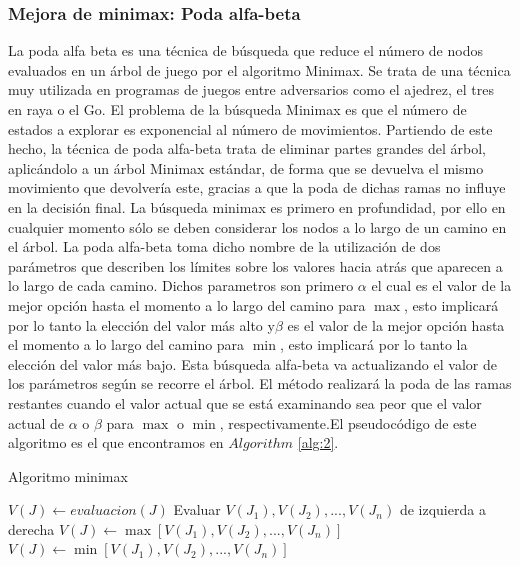 \documentclass[runningheads]{llncs}
\begin{document}
\subsubsection{Mejora de minimax: Poda alfa-beta}
La poda alfa beta es una técnica de búsqueda que reduce el número de nodos evaluados en un árbol de juego por el algoritmo Minimax. Se trata de una técnica muy utilizada en programas de juegos entre adversarios como el ajedrez, el tres en raya o el Go.
El problema de la búsqueda Minimax es que el número de estados a explorar es exponencial al número de movimientos. Partiendo de este hecho, la técnica de poda alfa-beta trata de eliminar partes grandes del árbol, aplicándolo a un árbol Minimax estándar, de forma que se devuelva el mismo movimiento que devolvería este, gracias a que la poda de dichas ramas no influye en la decisión final.
La búsqueda minimax es primero en profundidad, por ello en cualquier momento sólo se deben considerar los nodos a lo largo de un camino en el árbol.
La poda alfa-beta toma dicho nombre de la utilización de dos parámetros que describen los límites sobre los valores hacia atrás que aparecen a lo largo de cada camino. Dichos parametros son primero $\alpha$ el cual es el valor de la mejor opción hasta el momento a lo largo del camino para $\max$, esto implicará por lo tanto la elección del valor más alto y$\beta$ es el valor de la mejor opción hasta el momento a lo largo del camino para $\min$, esto implicará por lo tanto la elección del valor más bajo.
Esta búsqueda alfa-beta va actualizando el valor de los parámetros según se recorre el árbol. El método realizará la poda de las ramas restantes cuando el valor actual que se está examinando sea peor que el valor actual de $\alpha$ o $\beta$ para $\max$ o $\min$, respectivamente.El pseudocódigo de este algoritmo es el que encontramos en $Algorithm$ \ref{alg:2}.
\begin{algorithm}[H]
\caption{Algoritmo minimax}\label{alg:1}
\begin{algorithmic}
    \State $V(J)\gets evaluacion(J)$
    \State Evaluar $V(J_1),V(J_2),...,V(J_n)$ de izquierda a derecha
        \State $V(J) \gets \max[V(J_1),V(J_2),...,V(J_n)]$
    \EndIf
        \State $V(J) \gets \min[V(J_1),V(J_2),...,V(J_n)]$
\EndIf
\end{algorithmic}
\end{algorithm}
\end{document}
